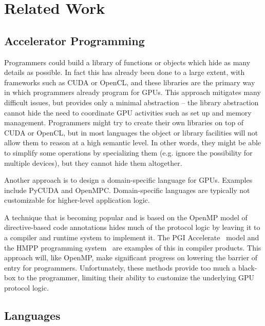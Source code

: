 
\section{Related Work}

\subsection{Accelerator Programming}

Programmers could build a library of functions or objects which hide as many
details as possible. In fact this has already been done to a large extent, with
frameworks such as CUDA or OpenCL, and these libraries are the primary way in
which programmers already program for GPUs. This approach mitigates many
difficult issues, but provides only a minimal abstraction -- the library
abstraction cannot hide the need to coordinate GPU activities such as set up and
memory management. Programmers might try to create their own libraries on top of
CUDA or OpenCL, but in most languages the object or library facilities will not
allow them to reason at a high semantic level. In other words, they might be
able to simplify some operations by specializing them (e.g. ignore the
possibility for multiple devices), but they cannot hide them altogether.

Another approach is to design a domain-specific language for GPUs. Examples
include PyCUDA and OpenMPC. Domain-specific languages are typically not
customizable for higher-level application logic.

A technique that is becoming popular and is based on the OpenMP model of
directive-based code annotations hides much of the protocol logic by leaving it
to a compiler and runtime system to implement it. The PGI
Accelerate~\cite{pgi-accelerate} model and the HMPP programming
system~\cite{hmpp} are examples of this in compiler products. This approach
will, like OpenMP, make significant progress on lowering the barrier of entry
for programmers. Unfortunately, these methods provide too much a black-box to
the programmer, limiting their ability to customize the underlying GPU protocol
logic.

\subsection{Languages}

